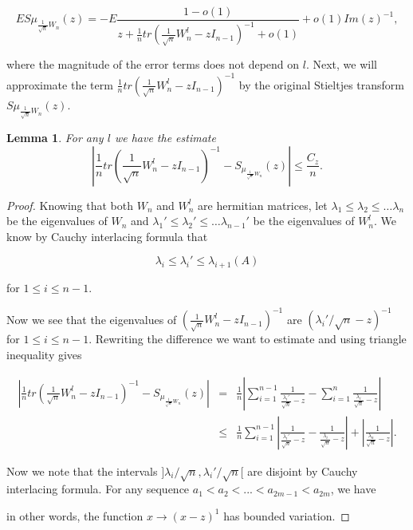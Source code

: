 \documentclass[12pt,a4paper,leqno]{report}
\theoremstyle{plain}
\newtheorem{lem}[equation]{Lemma}
\theoremstyle{definition}
\theoremstyle{remark}
\begin{document}
\begin{equation*}
ES\mu_{\frac{1}{\sqrt{n}}W_n}(z) = -E\frac{1-o(1)}{z+\frac{1}{n}tr(\frac{1}{\sqrt{n}}W_n^l-zI_{n-1})^{-1} + o(1)} + o(1)Im(z)^{-1},
\end{equation*}

where the magnitude of the error terms does not depend on $l$. Next, we will approximate the term $\frac{1}{n}tr(\frac{1}{\sqrt{n}}W_n^l-zI_{n-1})^{-1}$ by the original Stieltjes transform $S\mu_{\frac{1}{\sqrt{n}}W_n}(z)$.

\begin{lem}
For any $l$ we have the estimate
\begin{equation*}
|\frac{1}{n}tr(\frac{1}{\sqrt{n}}W_n^l-zI_{n-1})^{-1} - S_{\mu_{\frac{1}{\sqrt{n}}W_n}}(z)| \leq \frac{C_z}{n}.
\end{equation*}
\end{lem}

\begin{proof}
Knowing that both $W_n$ and $W_n^l$ are hermitian matrices, let $\lambda_1 \leq \lambda_2 \leq \ldots \lambda_n$ be the eigenvalues of $W_n$ and $\lambda_1' \leq \lambda_2' \leq \ldots \lambda_{n-1}'$ be the eigenvalues of $W_n^l$. We know by Cauchy interlacing formula that

\begin{equation*}
\lambda_{i} \leq \lambda_{i}' \leq \lambda_{i+1} (A)
\end{equation*}

for $1\leq i \leq n-1$.

Now we see that the eigenvalues of $(\frac{1}{\sqrt{n}}W_n^l-zI_{n-1})^{-1}$ are $(\lambda_i'/\sqrt{n}-z)^{-1}$ for $1\leq i \leq n-1$. Rewriting the difference we want to estimate and using triangle inequality gives

\begin{eqnarray*}
\left|\frac{1}{n}tr(\frac{1}{\sqrt{n}}W_n^l-zI_{n-1})^{-1} - S_{\mu_{\frac{1}{\sqrt{n}}W_n}}(z)\right| & = & \frac{1}{n}
\left|\sum_{i=1}^{n-1} \frac{1}{\frac{\lambda_i'}{\sqrt{n}}-z} - \sum_{i=1}^{n} \frac{1}{\frac{\lambda_i}{\sqrt{n}}-z}\right|\\
& \leq & \frac{1}{n}
\sum_{i=1}^{n-1} \left|\frac{1}{\frac{\lambda_i'}{\sqrt{n}}-z} - \frac{1}{\frac{\lambda_i}{\sqrt{n}}-z}\right| + \left|\frac{1}{\frac{\lambda_n}{\sqrt{n}}-z}\right|.
\end{eqnarray*}

Now we note that the intervals $]\lambda_i/\sqrt{n},\lambda_i'/\sqrt{n}[$ are disjoint by Cauchy interlacing formula. For any sequence $a_1 < a_2 < ... < a_{2m-1} < a_{2m}$, we have 

in other words, the function $x \to (x-z)^1$ has bounded variation. 
\end{proof}
\end{document}
